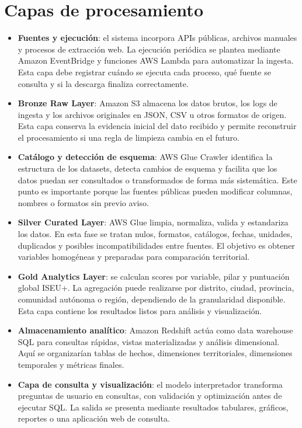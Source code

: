 \section{Capas de procesamiento}

\begin{itemize}
\item \textbf{Fuentes y ejecución}: el sistema incorpora APIs públicas, archivos manuales y procesos de extracción web. La ejecución periódica se plantea mediante Amazon EventBridge y funciones AWS Lambda para automatizar la ingesta. Esta capa debe registrar cuándo se ejecuta cada proceso, qué fuente se consulta y si la descarga finaliza correctamente.
\item \textbf{Bronze Raw Layer}: Amazon S3 almacena los datos brutos, los logs de ingesta y los archivos originales en JSON, CSV u otros formatos de origen. Esta capa conserva la evidencia inicial del dato recibido y permite reconstruir el procesamiento si una regla de limpieza cambia en el futuro.
\item \textbf{Catálogo y detección de esquema}: AWS Glue Crawler identifica la estructura de los datasets, detecta cambios de esquema y facilita que los datos puedan ser consultados o transformados de forma más sistemática. Este punto es importante porque las fuentes públicas pueden modificar columnas, nombres o formatos sin previo aviso.
\item \textbf{Silver Curated Layer}: AWS Glue limpia, normaliza, valida y estandariza los datos. En esta fase se tratan nulos, formatos, catálogos, fechas, unidades, duplicados y posibles incompatibilidades entre fuentes. El objetivo es obtener variables homogéneas y preparadas para comparación territorial.
\item \textbf{Gold Analytics Layer}: se calculan scores por variable, pilar y puntuación global ISEU+. La agregación puede realizarse por distrito, ciudad, provincia, comunidad autónoma o región, dependiendo de la granularidad disponible. Esta capa contiene los resultados listos para análisis y visualización.
\item \textbf{Almacenamiento analítico}: Amazon Redshift actúa como data warehouse SQL para consultas rápidas, vistas materializadas y análisis dimensional. Aquí se organizarían tablas de hechos, dimensiones territoriales, dimensiones temporales y métricas finales.
\item \textbf{Capa de consulta y visualización}: el modelo interpretador transforma preguntas de usuario en consultas, con validación y optimización antes de ejecutar SQL. La salida se presenta mediante resultados tabulares, gráficos, reportes o una aplicación web de consulta.
\end{itemize}

